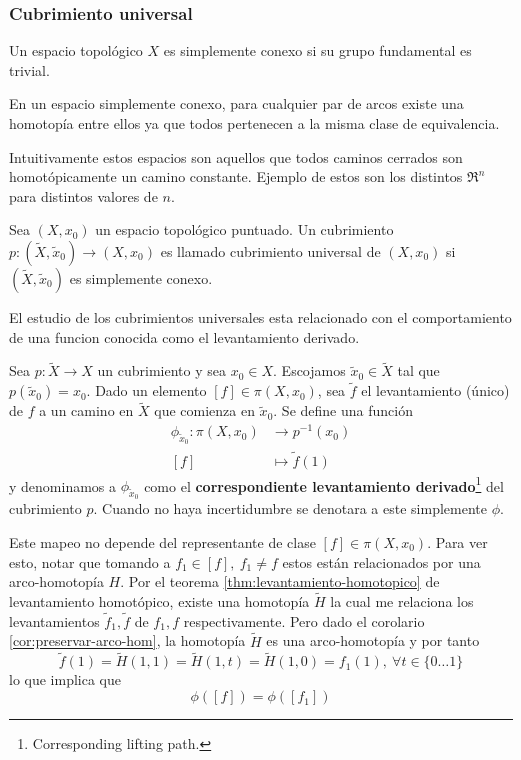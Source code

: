 \subsubsection{Cubrimiento universal}
\begin{definicion}
  Un espacio topológico \(X\) es simplemente conexo si su grupo
  fundamental es trivial.
\end{definicion}
\begin{acotacion}
  En un espacio simplemente conexo, para cualquier par de arcos
  existe una homotopía entre ellos ya que todos pertenecen a la misma
  clase de equivalencia.
\end{acotacion}
Intuitivamente estos espacios son aquellos que todos caminos cerrados
son homotópicamente un camino constante. Ejemplo de estos son los
distintos \(\Re^n\) para distintos valores de \(n\).
\begin{definicion}
  Sea \(\left( X, x_0 \right)\) un espacio topológico puntuado. Un
  cubrimiento \(p : \left( \tilde X , \tilde x _0 \right) \to \left( X ,
    x _0 \right)\) es llamado cubrimiento universal de \( \left(
    X , x _0 \right)\) si \(\left( \tilde X , \tilde x _0
  \right)\) es simplemente conexo.
\end{definicion}
El estudio de los cubrimientos universales esta relacionado con el
comportamiento de una funcion conocida como el levantamiento derivado.
\begin{definicion} \label{def:levantamiento-derivado}
  Sea \(p : \tilde X \to X\) un cubrimiento y sea \(x_0 \in X\).
  Escojamos \(\tilde x _0 \in \tilde X\) tal que \(p(\tilde x _0) =
  x_0\). Dado un elemento \([f] \in \pi (X, x_0)\), sea \(\tilde f\) el
  levantamiento (único) de \(f\) a un camino en \(\tilde X\) que
  comienza en \(\tilde x _0\). Se define una función
  \begin{align*}
    \phi_{\tilde x_0} : \pi (X, x_0) &\longrightarrow p^{-1} (x_0) \\
    [f] &\longmapsto \tilde f (1)
  \end{align*}
  y denominamos a \(\phi_{\tilde x_0}\) como el \textbf{correspondiente
  levantamiento derivado}\footnote{Corresponding lifting path.} del
  cubrimiento \(p\). Cuando no haya incertidumbre se denotara a este
  simplemente \(\phi\).
\end{definicion}
\begin{acotacion} \label{aco:indep-phi}
  Este mapeo no depende del representante de clase \([f] \in \pi \left(
    X, x_0 \right)\). Para ver esto, notar que tomando a \(f_1 \in [f]
  ,\ f_1 \neq f\) estos están relacionados por una arco-homotopía
  \(H\). Por el teorema \ref{thm:levantamiento-homotopico} de
  levantamiento homotópico, existe una homotopía \(\tilde H\) la cual me
  relaciona los levantamientos \(\tilde f_1 , \tilde f\) de \(f_1 , f\)
  respectivamente. Pero dado el corolario \ref{cor:preservar-arco-hom},
  la homotopía \(\tilde H\) es una arco-homotopía y por tanto
  \[ \tilde f (1) = \tilde H (1, 1) = \tilde H (1, t) = \tilde H (1, 0)
    = f_1 (1) ,\ \forall t \in \{0 \dotsc 1\} \]
  lo que implica que
  \[ \phi ([f]) = \phi ([f_1])\]
\end{acotacion}


